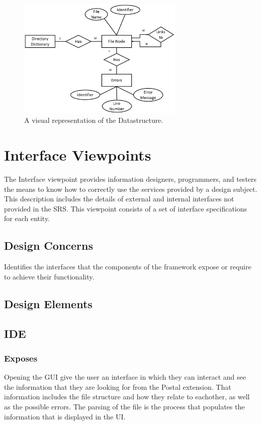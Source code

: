 \documentclass[letterpaper,10pt,titlepage,draftclsnofoot,onecolumn,onesided] {IEEEtran}
\begin{document}
	\begin{figure}
        \includegraphics[width=300px]{InformationERDEPS.eps}
        \caption{A visual representation of the Datastructure.}
    \end{figure}
		
		
		
\section{Interface Viewpoints}
The Interface viewpoint provides information designers, programmers, and testers the means to know how
to correctly use the services provided by a design subject. This description includes the details of external
and internal interfaces not provided in the SRS. This viewpoint consists of a set of interface specifications
for each entity. 
\subsection{Design Concerns}
Identifies the interfaces that the components of the framework expose or require to achieve their
functionality. 
\subsection{Design Elements}


	\subsection{IDE}
		\subsubsection{Exposes}
			Opening the GUI give the user an interface in which they can interact and see the information that they are looking for from the Postal extension.
			That information includes the file structure and how they relate to eachother, as well as the possible errors. 
			The parsing of the file is the process that populates the information that is displayed in the UI.
\end{document}
